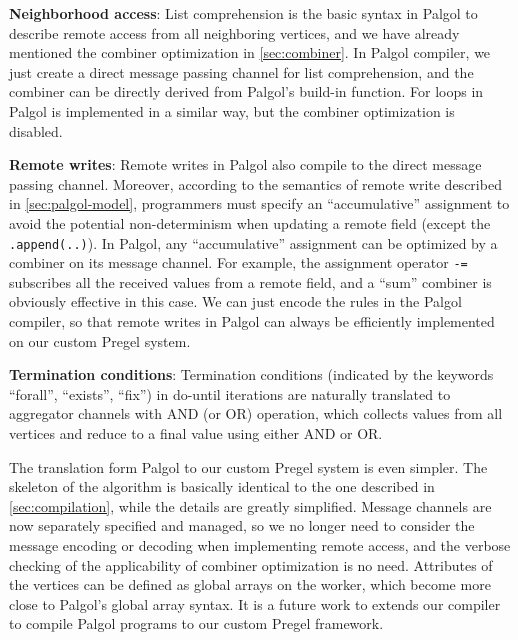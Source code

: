 \documentclass{sokendai_thesis} %
\begin{document}
\textbf{Neighborhood access}: List comprehension is the basic syntax in Palgol to describe remote access from all neighboring vertices, and we have already mentioned the combiner optimization in \autoref{sec:combiner}.
In Palgol compiler, we just create a direct message passing channel for list comprehension, and the combiner can be directly derived from Palgol's build-in function.
For loops in Palgol is implemented in a similar way, but the combiner optimization is disabled.

\textbf{Remote writes}: Remote writes in Palgol also compile to the direct message passing channel.
Moreover, according to the semantics of remote write described in \autoref{sec:palgol-model}, programmers must specify an ``accumulative'' assignment to avoid the potential non-determinism when updating a remote field (except the \texttt{.append(..)}).
In Palgol, any ``accumulative'' assignment can be optimized by a combiner on its message channel.
For example, the assignment operator \texttt{-=} subscribes all the received values from a remote field, and a ``sum'' combiner is obviously effective in this case.
We can just encode the rules in the Palgol compiler, so that remote writes in Palgol can always be efficiently implemented on our custom Pregel system.

\textbf{Termination conditions}: Termination conditions (indicated by the keywords ``forall'', ``exists'', ``fix'') in do-until iterations are naturally translated to aggregator channels with AND (or OR) operation, which collects values from all vertices and reduce to a final value using either AND or OR.

The translation form Palgol to our custom Pregel system is even simpler.
The skeleton of the algorithm is basically identical to the one described in \autoref{sec:compilation}, while the details are greatly simplified.
Message channels are now separately specified and managed, so we no longer need to consider the message encoding or decoding when implementing remote access, and the verbose checking of the applicability of combiner optimization is no need.
Attributes of the vertices can be defined as global arrays on the worker, which become more close to Palgol's global array syntax.
It is a future work to extends our compiler to compile Palgol programs to our custom Pregel framework.
\end{document}
